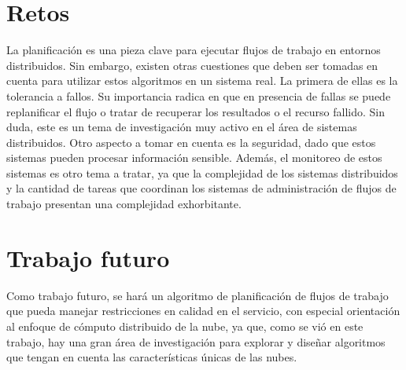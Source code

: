 \section{Retos}
La planificación es una pieza clave para ejecutar flujos de trabajo en entornos distribuidos. Sin embargo, existen otras cuestiones que deben ser tomadas en cuenta para utilizar estos algoritmos en un sistema real. La primera de ellas es la tolerancia a fallos. Su importancia radica en que en presencia de fallas se puede replanificar el flujo o tratar de recuperar los resultados o el recurso fallido. Sin duda, este es un tema de investigación muy activo en el área de sistemas distribuidos. Otro aspecto a tomar en cuenta es la seguridad, dado que estos sistemas pueden procesar información sensible. Además, el monitoreo de estos sistemas es otro tema a tratar, ya que la complejidad de los sistemas distribuidos y la cantidad de tareas que coordinan los sistemas de administración de flujos de trabajo presentan una complejidad exhorbitante.

\section{Trabajo futuro}
Como trabajo futuro, se hará un algoritmo de planificación de flujos de trabajo que pueda manejar restricciones en calidad en el servicio, con especial orientación al enfoque de cómputo distribuido de la nube, ya que, como se vió en este trabajo, hay una gran área de investigación para explorar y diseñar algoritmos que tengan en cuenta las características únicas de las nubes.